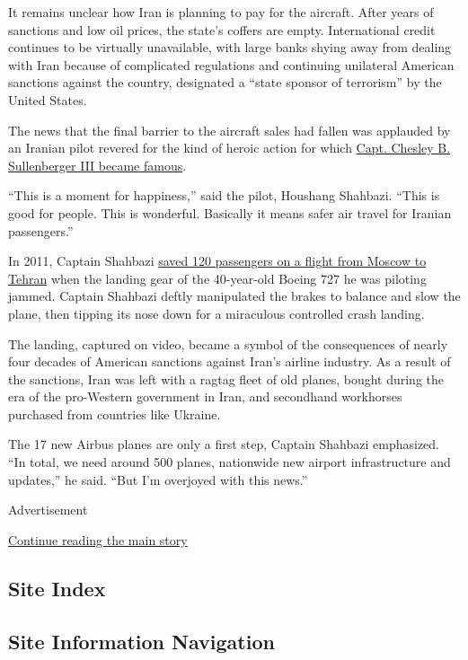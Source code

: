 It remains unclear how Iran is planning to pay for the aircraft. After
years of sanctions and low oil prices, the state's coffers are empty.
International credit continues to be virtually unavailable, with large
banks shying away from dealing with Iran because of complicated
regulations and continuing unilateral American sanctions against the
country, designated a ``state sponsor of terrorism'' by the United
States.

The news that the final barrier to the aircraft sales had fallen was
applauded by an Iranian pilot revered for the kind of heroic action for
which
\href{http://www.nytimes3xbfgragh.onion/2009/01/17/nyregion/17pilot.html?hp}{Capt.
Chesley B. Sullenberger III became famous}.

``This is a moment for happiness,'' said the pilot, Houshang Shahbazi.
``This is good for people. This is wonderful. Basically it means safer
air travel for Iranian passengers.''

In 2011, Captain Shahbazi
\href{http://www.nytimes3xbfgragh.onion/2012/07/14/world/middleeast/irans-airliners-falter-under-sanctions.html}{saved
120 passengers on a flight from Moscow to Tehran} when the landing gear
of the 40-year-old Boeing 727 he was piloting jammed. Captain Shahbazi
deftly manipulated the brakes to balance and slow the plane, then
tipping its nose down for a miraculous controlled crash landing.

The landing, captured on video, became a symbol of the consequences of
nearly four decades of American sanctions against Iran's airline
industry. As a result of the sanctions, Iran was left with a ragtag
fleet of old planes, bought during the era of the pro-Western government
in Iran, and secondhand workhorses purchased from countries like
Ukraine.

The 17 new Airbus planes are only a first step, Captain Shahbazi
emphasized. ``In total, we need around 500 planes, nationwide new
airport infrastructure and updates,'' he said. ``But I'm overjoyed with
this news.''

Advertisement

\protect\hyperlink{after-bottom}{Continue reading the main story}

\hypertarget{site-index}{%
\subsection{Site Index}\label{site-index}}

\hypertarget{site-information-navigation}{%
\subsection{Site Information
Navigation}\label{site-information-navigation}}

